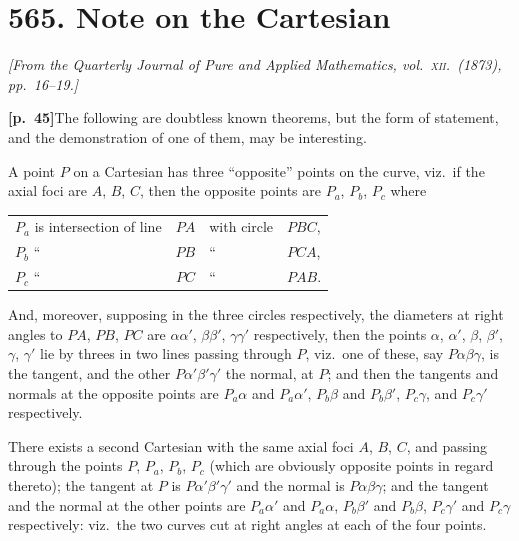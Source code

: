 \documentclass[11pt,a4paper]{article}
\begin{document}
\bigskip

\section*{\textbf{565.} Note on the Cartesian}

\noindent\textit{[From the Quarterly Journal of Pure and Applied Mathematics, vol.\ \textsc{xii}.\ (1873), pp.~16--19.]}

\bigskip

\noindent\textbf{[p.~45]}\quad The following are doubtless known theorems, but the form of statement, and the demonstration of one of them, may be interesting.

A point $P$ on a Cartesian has three ``opposite'' points on the curve, viz.\ if the axial foci are $A$, $B$, $C$, then the opposite points are $P_{a}$, $P_{b}$, $P_{c}$ where
\begin{center}
\begin{tabular}{lcll}
$P_{a}$ is intersection of line & $PA$ & with circle & $PBC$, \\
$P_{b}$  ``\quad     & $PB$  &  ``\quad   & $PCA$, \\
$P_{c}$  ``\quad     & $PC$  &  ``\quad   & $PAB$.
\end{tabular}
\end{center}
And, moreover, supposing in the three circles respectively, the diameters at right angles to $PA$, $PB$, $PC$ are $\alpha\alpha'$, $\beta\beta'$, $\gamma\gamma'$ respectively, then the points $\alpha$, $\alpha'$, $\beta$, $\beta'$, $\gamma$, $\gamma'$ lie by threes in two lines passing through $P$, viz.\ one of these, say $P\alpha\beta\gamma$, is the tangent, and the other $P\alpha'\beta'\gamma'$ the normal, at $P$; and then the tangents and normals at the opposite points are $P_{a}\alpha$ and $P_{a}\alpha'$, $P_{b}\beta$ and $P_{b}\beta'$, $P_{c}\gamma$, and $P_{c}\gamma'$ respectively.

There exists a second Cartesian with the same axial foci $A$, $B$, $C$, and passing through the points $P$, $P_{a}$, $P_{b}$, $P_{c}$ (which are obviously opposite points in regard thereto); the tangent at $P$ is $P\alpha'\beta'\gamma'$ and the normal is $P\alpha\beta\gamma$; and the tangent and the normal at the other points are $P_{a}\alpha'$ and $P_{a}\alpha$, $P_{b}\beta'$ and $P_{b}\beta$, $P_{c}\gamma'$ and $P_{c}\gamma$ respectively: viz.\ the two curves cut at right angles at each of the four points.
\end{document}
